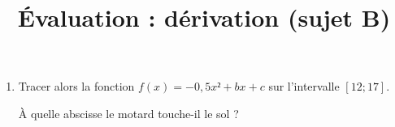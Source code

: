 \documentclass[
	classe=$1^{ere}STI2D$,
]{évaluation}
\begin{document}
\begin{exercice}
\begin{enumerate}
\begin{enumerate}
			            D'après la question $1$, quelle est la valeur de $f'(12)$ ?

			            On admet que sur l'intervalle $\intervalle{[}{12}{+∞}{[}$, la dérivée de $f$ peut s'écrire $f'(x) = -x + b$. Quelle est alors la valeur de $b$ ?

			      \item Lire sur le graphe la valeur de $f(12)$. En déduire la valeur de $c$.

		      \end{enumerate}
		\item Tracer alors la fonction $f(x) = -0,5x² + bx + c$ sur l'intervalle $[12;17]$.

		      À quelle abscisse le motard touche-il le sol ?
	\end{enumerate}
\end{exercice}

\newpage
\setcounter{exercice}{1}

\title{Évaluation : dérivation (sujet B)}
\maketitle
\end{document}
